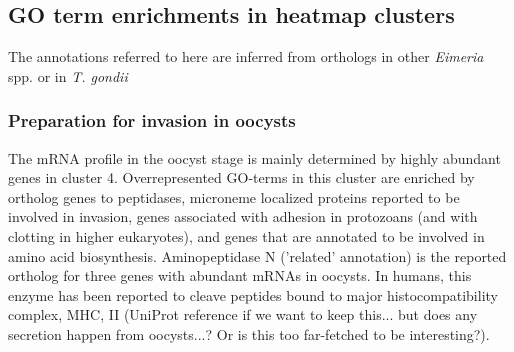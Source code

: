 \documentclass{bmcart}
\begin{document}




\subsection*{GO term enrichments in heatmap clusters}
The annotations referred to here are inferred from orthologs in other \textit{Eimeria} spp. or
in \textit{T. gondii}


\subsubsection*{Preparation for invasion in oocysts}
The mRNA profile in the oocyst stage is mainly determined by highly
abundant genes in cluster 4.  Overrepresented GO-terms in this cluster
are enriched by ortholog genes to peptidases, microneme localized
proteins reported to be involved in invasion, genes associated with
adhesion in protozoans (and with clotting in higher eukaryotes), and
genes that are annotated to be involved in amino acid biosynthesis.
Aminopeptidase N ('related' annotation) is the reported ortholog for
three genes with abundant mRNAs in oocysts. In humans, this enzyme has
been reported to cleave peptides bound to major histocompatibility
complex, MHC, II (UniProt reference if we want to keep this... but
does any secretion happen from oocysts...? Or is this too far-fetched
to be interesting?).
\end{document}
